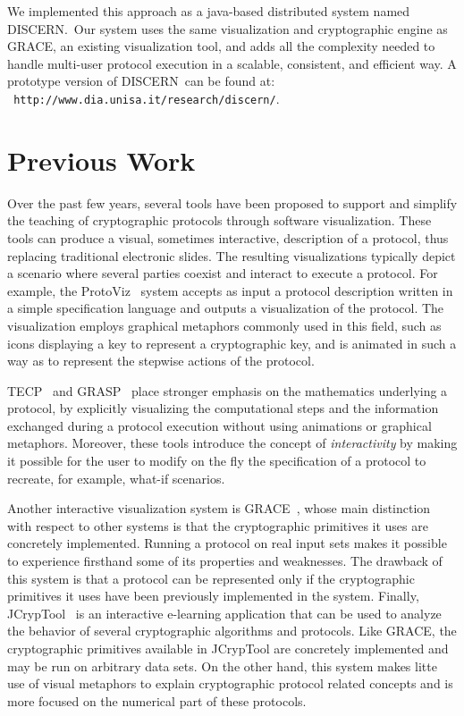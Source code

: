 \documentclass[10pt,conference]{IEEEtran}
\def\disgrace{DISCERN}
\begin{document}



We implemented this approach as a java-based distributed system named
\disgrace.\ Our system uses the same visualization and cryptographic
engine as GRACE, an existing visualization tool, and adds all the
complexity needed to handle multi-user protocol execution in a
scalable, consistent, and efficient way. A prototype version of \disgrace\ can be found at:\\ {\tt
 http://www.dia.unisa.it/research/discern/}.


\section{Previous Work}
Over the past few years, several tools have been proposed to support
and simplify the teaching of cryptographic protocols through software
visualization. These tools can produce a visual, sometimes
interactive, description of a protocol, thus replacing traditional
electronic slides. The resulting visualizations typically depict a
scenario where several parties coexist and interact to execute a
protocol. For example, the ProtoViz~\cite{Protoviz} system accepts as
input a protocol description written in a simple specification
language and outputs a visualization of the protocol. The
visualization employs graphical metaphors commonly used in this field,
such as icons displaying a key to represent a cryptographic key, and
is animated in such a way as to represent the stepwise actions of the
protocol.


TECP~\cite{TECP} and GRASP~\cite{Schweitzer06} place stronger emphasis
on the mathematics underlying a protocol, by explicitly visualizing
the computational steps and the information exchanged during a
protocol execution without using animations or graphical
metaphors. Moreover, these tools introduce the concept of {\em
  interactivity} by making it possible for the user to modify on the
fly the specification of a protocol to recreate, for example, what-if
scenarios.

Another interactive visualization system is GRACE~\cite{Cattaneo08},
whose main distinction with respect to other systems is that the
cryptographic primitives it uses are concretely implemented. Running a protocol on real input sets makes it
possible to experience firsthand some of its properties and
weaknesses. The drawback of this system is that a protocol can be
represented only if the cryptographic primitives it uses have been
previously implemented in the system. Finally,
JCrypTool~\cite{jcryptool} is an interactive e-learning application that can be used
to analyze the behavior of several cryptographic algorithms and
protocols. Like GRACE, the cryptographic primitives available in
JCrypTool are concretely implemented and may be run on arbitrary data
sets. On the other hand, this system makes litte use of visual metaphors
to explain cryptographic protocol related concepts and is more focused
on the numerical part of these protocols.
\end{document}
